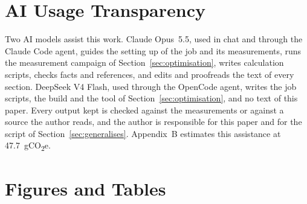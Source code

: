 \documentclass[conference,a4paper]{IEEEtran}
\newif\ifguidance
\newcommand{\guidance}[1]{\ifguidance{\itshape\small #1\par\medskip}\fi}
\newcommand{\aitotal}{47.7}
\begin{document}
\section*{AI Usage Transparency}
Two AI models assist this work. Claude Opus~5.5, used in chat and through the
Claude Code agent, guides the setting up of the job and its measurements, runs
the measurement campaign of Section~\ref{sec:optimisation}, writes calculation
scripts, checks facts and references, and edits and proofreads the text of every
section. DeepSeek V4 Flash, used through the OpenCode agent, writes the job
scripts, the build and the tool of Section~\ref{sec:optimisation}, and no text of
this paper. Every output kept is checked against the measurements or against a
source the author reads, and the author is responsible for this paper and for
the script of Section~\ref{sec:generalises}. Appendix~B estimates this
assistance at \aitotal~gCO\textsubscript{2}e.

\ifguidance
\noindent\textit{Worked example, written from the two journal entries of
Appendix~B.}

Two models assisted this work. ChatGPT (GPT-5.6 Sol) was used in chat, to
explain the inventory and impact concepts I had not understood and to review
the prose of this paper. DeepSeek V4-Flash was used agentically, to apply the
optimisations to the job, to write the script that carries the method to any
job, and to re-run the measurement protocol after each change. Every
output I kept was checked against a source I read myself, and the six wrong
answers I caught are listed in Appendix~B. I am the author of this paper and
of the script. The assistance amounts to 251\,000 output tokens, estimated at
28 gCO\textsubscript{2}e in Appendix~B.
\fi




\guidance{\medskip
\noindent\textbf{Appendices.}
\textbf{Every figure and every table in your paper goes in
Appendix~A.} Do not put a single figure or table in the body: refer to them
from the text, and place them all there.}

\appendices
\section{Figures and Tables}
\guidance{Every figure and every table of your paper.}
\end{document}
